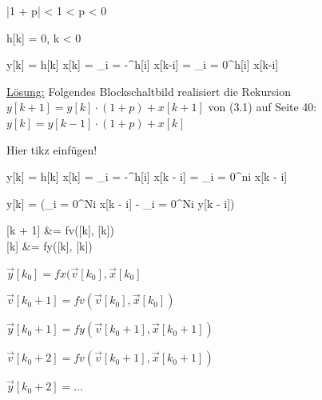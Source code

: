 \documentclass[parskip=half]{scrreprt}
\begin{document}
\begin{abox}
	\left|1 + p\right| < 1\quad{} < p < 0
\end{abox}

\begin{abox}
	h[k] = 0, \quad\forall k < 0
\end{abox}

\begin{abox}
	y[k] = h[k] \ast x[k] = \sum_{i = -\infty}^{\infty}h[i] \cdot x[k-i] = \sum_{i = 0}^{\infty}h[i] \cdot x[k-i]
\end{abox}

\begin{tbox}
	\underline{Lösung:} Folgendes Blockschaltbild realisiert die Rekursion $ y[k + 1] = y[k] \cdot (1 + p) + x[k + 1] $ von (3.1) auf Seite 40: $ y[k] = y[k - 1] \cdot (1 + p) + x[k] $
	
	Hier tikz einfügen!
\end{tbox}

\begin{abox}
	y[k] = h[k] \ast x[k] = \sum_{i = -\infty}^{\infty}h[i] \cdot x[k - i] = \sum_{i = 0}^{n}\beta i \cdot x[k - i]
\end{abox}

\begin{abox}
	y[k] =  \cdot \left(\sum_{i = 0}^{N}\beta i \cdot x[k - i] - \sum_{i = 0}^{N}\alpha i \cdot y[k - i]\right)
\end{abox}

\begin{abox}
	[k + 1] &= fv(, )\\
	 &= fy(, )
\end{abox}

\begin{tbox}
	\begin{enumerate*}[label=\Roman*), series = tobecont]
		\item $ \vec{y}[k_0] = fx(\vec{v}[k_0], \vec{x}[k_0] $
		\item $ \vec{v}[k_0 + 1] = fv(\vec{v}[k_0], \vec{x}[k_0]) $
	\end{enumerate*}
	\begin{enumerate*}[label=\Roman*), resume = tobecont]
		\item $ \vec{y}[k_0 + 1] = fy(\vec{v}[k_0 + 1], \vec{x}[k_0 + 1]) $
		\item $ \vec{v}[k_0 + 2] = fv(\vec{v}[k_0 + 1], \vec{x}[k_0 + 1]) $
	\end{enumerate*}
	\begin{enumerate*}[label=\Roman*), resume = tobecont]
		\item $ \vec{y}[k_0 + 2] = \dots $
	\end{enumerate*}
\end{tbox}
\end{document}
